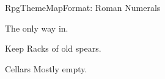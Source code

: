 \begin{ExampleBlock}{RpgThemeMapFormat: Roman Numerals}
\ExplSyntaxOn
{}
\ExplSyntaxOff

\begin{RpgMap}[header-offset=2]
     The only way in.

    \begin{RpgArea}{Keep}
         Racks of old spears.

        \begin{RpgArea}{Cellars}
             Mostly empty.
        \end{RpgArea}
    \end{RpgArea}
\end{RpgMap}


\end{ExampleBlock}
